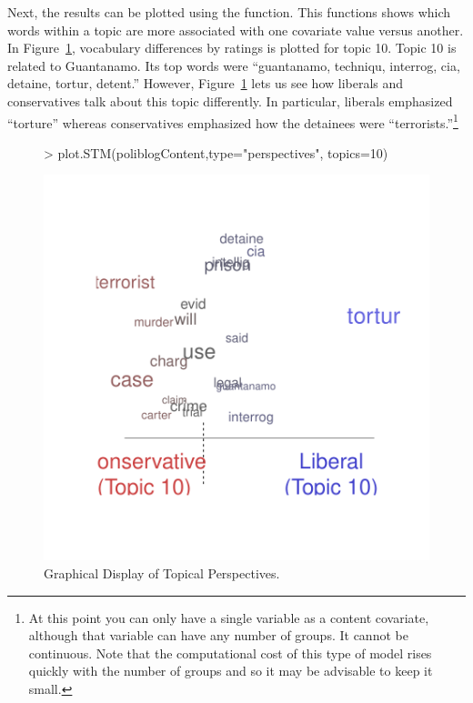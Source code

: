 \documentclass[nojss]{jss}
\begin{document}
\begin{Schunk}
\end{Schunk}

Next, the results can be plotted using the  function.  This functions shows which words within a topic are more associated with one covariate value versus another. In Figure~\ref{fig:perp}, vocabulary differences by ratings is plotted for topic 10. Topic 10 is related to Guantanamo. Its top words were ``guantanamo, techniqu, interrog, cia, detaine, tortur, detent.'' However, Figure~\ref{fig:perp} lets us see how liberals and conservatives talk about this topic differently. In particular, liberals emphasized ``torture'' whereas conservatives emphasized how the detainees were ``terrorists.''\footnote{At this point you can only
 have a single variable as a content covariate, although that variable can have any number of groups. It cannot be continuous. Note that the computational cost of this type of model rises quickly with the number of groups and so it may be advisable to keep it small.}

\begin{figure}
\begin{center}
\begin{Schunk}
\begin{Sinput}
> plot.STM(poliblogContent,type="perspectives", topics=10)
\end{Sinput}
\end{Schunk}
\includegraphics{stmVignette-018}
\caption{Graphical Display of Topical Perspectives.}
\label{fig:perp}
\end{center}
\end{figure}
\end{document}
